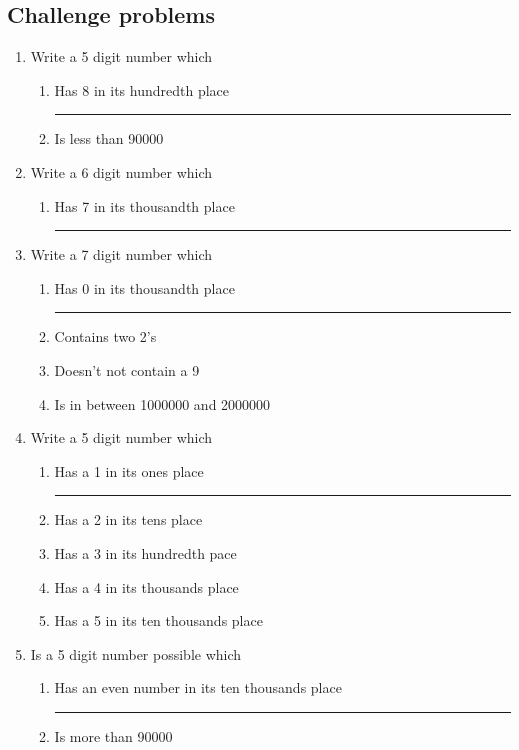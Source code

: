\documentclass[11pt]{article}
\begin{document}
\subsection{Challenge problems}

\begin{enumerate}
    \item Write a 5 digit number which
    \begin{enumerate}[topsep=0pt, label=\alph*.]
        \item Has 8 in its hundredth place  \rule[-5pt]{5cm}{0.5pt}
        \item Is less than 90000
    \end{enumerate}

    \item Write a 6 digit number which
    \begin{enumerate}[topsep=0pt, label=\alph*.]
        \item Has 7 in its thousandth place  \rule[-5pt]{5cm}{0.5pt}
    \end{enumerate}

    \item Write a 7 digit number which
    \begin{enumerate}[topsep=0pt, label=\alph*.]
        \item Has 0 in its thousandth place  \rule[-5pt]{5cm}{0.5pt}
        \item Contains two 2's
        \item Doesn't not contain a 9
        \item Is in between 1000000 and 2000000
    \end{enumerate}

    \item Write a 5 digit number which
    \begin{enumerate}[topsep=0pt, label=\alph*.]
        \item Has a 1 in its ones place  \rule[-5pt]{5cm}{0.5pt}
        \item Has a 2 in its tens place
        \item Has a 3 in its hundredth pace
        \item Has a 4 in its thousands place
        \item Has a 5 in its ten thousands place
    \end{enumerate}

    \item Is a 5 digit number possible which
    \begin{enumerate}[topsep=0pt, label=\alph*.]
        \item Has an even number in its ten thousands place  \rule[-5pt]{1cm}{0.5pt}
        \item Is more than 90000
    \end{enumerate}
\end{enumerate}
\end{document}
